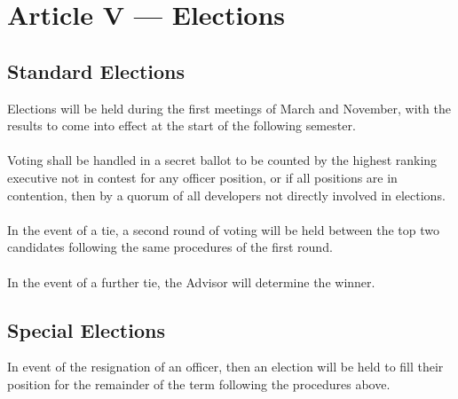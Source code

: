 \documentclass{article}
\begin{document}
  \section{Article V --- Elections}
  \subsection{Standard Elections}
  Elections will be held during the first meetings of March and 
  November, with the results to come into effect at the start 
  of the following semester.
  \\ \\
  Voting shall be handled in a secret ballot to be counted by the 
  highest ranking executive not in contest for any officer position, or if
  all positions are in contention, then by a quorum of all developers
  not directly involved in elections.
  \\ \\
  In the event of a tie, a second round of voting will be held between 
  the top two candidates following the same procedures of the first 
  round.
  \\ \\
  In the event of a further tie, the Advisor will determine the winner.
  
  \subsection{Special Elections}
  In event of the resignation of an officer, then an election will be 
  held to fill their position for the remainder of the term following 
  the procedures above.
  
\end{document}
